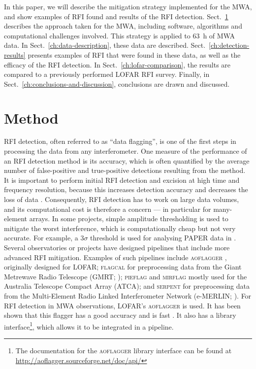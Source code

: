 \documentclass{pasa}
\begin{document}
In this paper, we will describe the mitigation strategy implemented for the MWA, and show examples of RFI found and results of the RFI detection. Sect.~\ref{ch:method} describes the approach taken for the MWA, including software, algorithms and computational challenges involved. This strategy is applied to 63~h of MWA data. In Sect.~\ref{ch:data-description}, these data are described. Sect.~\ref{ch:detection-results} presents examples of RFI that were found in these data, as well as the efficacy of the RFI detection. In Sect.~\ref{ch:lofar-comparison}, the results are compared to a previously performed LOFAR RFI survey. Finally, in Sect.~\ref{ch:conclusions-and-discussion}, conclusions are drawn and discussed.

\section{Method} \label{ch:method}
RFI detection, often referred to as ``data flagging'', is one of the first steps in processing the data from any interferometer. One measure of the performance of an RFI detection method is its accuracy, which is often quantified by the average number of false-positive and true-positive detections resulting from the method. It is important to perform initial RFI detection and excision at high time and frequency resolution, because this increases detection accuracy and decreases the loss of data \citep{lofar-radio-environment}. Consequently, RFI detection has to work on large data volumes, and its computational cost is therefore a concern --- in particular for many-element arrays. In some projects, simple amplitude thresholding is used to mitigate the worst interference, which is computationally cheap but not very accurate. For example, a $3\sigma$ threshold is used for analysing PAPER data in \citet{parsons-paper-eorlimit-2014}. Several observatories or projects have designed pipelines that include more advanced RFI mitigation. Examples of such pipelines include \textsc{aoflagger} \citep{post-correlation-rfi-classification,scale-invariant-rank-operator}, originally designed for LOFAR; \textsc{flagcal} for preprocessing data from the Giant Metrewave Radio Telescope (GMRT; \citealt{prasad-flagcal-2012}); \textsc{pieflag} \citep{pieflag-middelberg-2006} and \textsc{mirflag} \citep{lenc-mirflag-2010} mostly used for the Australia Telescope Compact Array (ATCA); and \textsc{serpent} for preprocessing data from the Multi-Element Radio Linked Interferometer Network (e-MERLIN; \citealt{serpent-peck-2013}). For RFI detection in MWA observations, LOFAR's \textsc{aoflagger} is used. It has been shown that this flagger has a good accuracy and is fast \citep{lofar-radio-environment}. It also has a library interface\footnote{The documentation for the \textsc{aoflagger} library interface can be found at \url{http://aoflagger.sourceforge.net/doc/api/}}, which allows it to be integrated in a pipeline.
\end{document}
